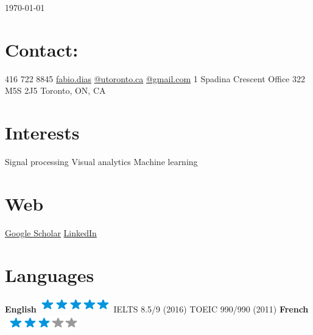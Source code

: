 \documentclass[]{friggeri-cv}
\begin{document}
      

\begin{aside}
  \today
  \section{Contact:}
   416 722 8845\vspace{0.5\baselineskip}
   \href{mailto:fabio.dias@gmail.com}{fabio.dias}
   \href{mailto:fabio.dias@utoronto.ca}{@utoronto.ca}
   \href{mailto:fabio.dias@gmail.com}{@gmail.com}\vspace{\baselineskip}
   1 Spadina Crescent
   Office 322
   M5S 2J5
   Toronto, ON, CA
  \section{Interests}
    Signal processing
    Visual analytics
    Machine learning
  \section{Web}
    \href{https://scholar.google.com.br/citations?user=0D1ExLoAAAAJ}{Google Scholar}
    \href{https://www.linkedin.com/in/fabio-dias}{LinkedIn}
  \section{Languages}
  \textbf{English}\includegraphics[scale=0.40]{img/5stars.png}
  IELTS 8.5/9 (2016)
  TOEIC 990/990 (2011)
  \textbf{French}\includegraphics[scale=0.40]{img/3stars.png}
\end{aside}
\end{document}
